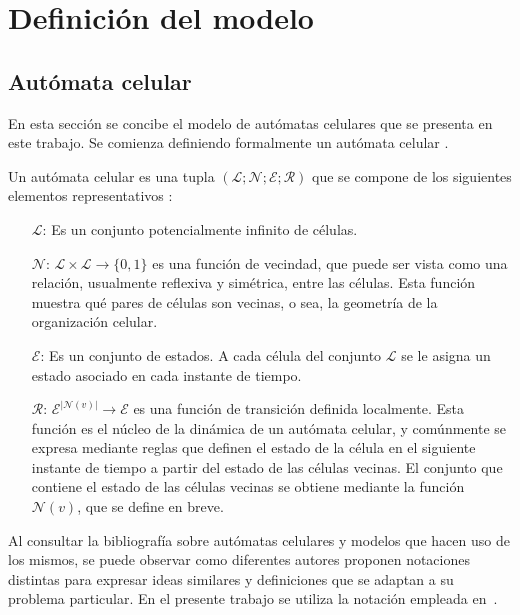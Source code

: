 \chapter{Definici\'on del modelo}\label{chapter:proposal}

\section{Aut\'omata celular}

En esta secci\'on se concibe el modelo de aut\'omatas celulares que se presenta en este trabajo. Se comienza definiendo formalmente un aut\'omata celular \cite{viabarre2019}.

Un aut\'omata celular es una tupla $(\mathcal{L}; \mathcal{N}; \mathcal{E}; \mathcal{R})$ que se compone de los siguientes elementos representativos \cite{ariel}:
\begin{itemize}
\item [$\mathcal{L}$:] Es un conjunto potencialmente infinito de c\'elulas.
\item [$\mathcal{N}$:] $\mathcal{L} \times \mathcal{L} \rightarrow \lbrace 0,1 \rbrace$ es una funci\'on de vecindad, que puede ser vista como una relaci\'on, usualmente reflexiva y sim\'etrica, entre las c\'elulas. Esta funci\'on muestra qu\'e pares de c\'elulas son vecinas, o sea, la geometr\'ia de la organizaci\'on celular.
\item [$\mathcal{E}$:]  Es un conjunto de estados. A cada c\'elula del conjunto $\mathcal{L}$ se le asigna un estado asociado en cada instante de tiempo.
\item [$\mathcal{R}$:] $\mathcal{E}^{|\mathcal{N}(v)|} \rightarrow \mathcal{E}$ es una funci\'on de transici\'on definida localmente. Esta funci\'on es el n\'ucleo de la din\'amica de un aut\'omata celular, y com\'unmente se expresa mediante reglas que definen el estado de la c\'elula en el siguiente instante de tiempo a partir del estado de las c\'elulas vecinas. El conjunto que contiene el estado de las c\'elulas vecinas se obtiene mediante la funci\'on $\mathcal{N}(v)$, que se define en breve.
\end{itemize}

Al consultar la bibliografía sobre autómatas celulares y modelos que hacen uso de los mismos, se puede observar como diferentes autores proponen notaciones distintas  para expresar ideas similares y definiciones que se adaptan a su problema particular.
En el presente trabajo se utiliza la notaci\'on empleada en~\cite[p\'aginas 59-101]{book}. 

